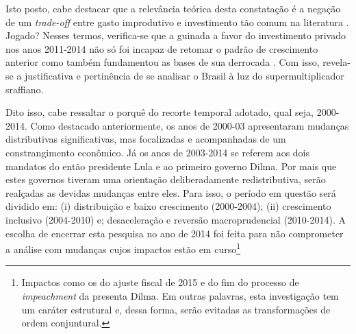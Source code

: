 Isto posto, cabe destacar que a
relevância teórica desta constatação é a negação de um \textit{trade-off} entre gasto improdutivo e investimento tão comum na literatura \cite{serrano_acumulacao_2001}. {\color{blue} Jogado?}
Nesses termos, verifica-se que a guinada a favor do investimento privado nos anos 2011-2014 não só foi incapaz de retomar o padrão de crescimento anterior como também fundamentou as bases de sua derrocada \cite{serrano_demanda_2015}. Com isso, revela-se a justificativa e pertinência de se analisar o Brasil à luz do supermultiplicador sraffiano.



Dito isso, cabe ressaltar o porquê do recorte temporal adotado, qual seja, 2000-2014. Como destacado anteriormente, os anos de 2000-03 apresentaram mudanças distributivas significativas, mas focalizadas e acompanhadas de um constrangimento econômico.
Já os anos de 2003-2014 se referem aos dois mandatos do então presidente Lula e ao primeiro governo Dilma. Por mais que estes governos tiveram uma orientação deliberadamente redistributiva, serão realçadas as devidas mudanças entre eles. Para isso, o período em questão será dividido em: (i) distribuição e baixo crescimento (2000-2004); (ii) crescimento inclusivo (2004-2010) e; desaceleração e reversão macroprudencial  (2010-2014).
A escolha de encerrar esta pesquisa no ano de 2014 foi feita para não comprometer a análise com mudanças cujos impactos estão em curso\footnote{Impactos como os do ajuste fiscal de 2015 e do fim do processo de \textit{impeachment} da presenta Dilma. Em outras palavras, esta investigação tem um caráter estrutural e, dessa forma, serão evitadas as transformações de ordem conjuntural. } 







